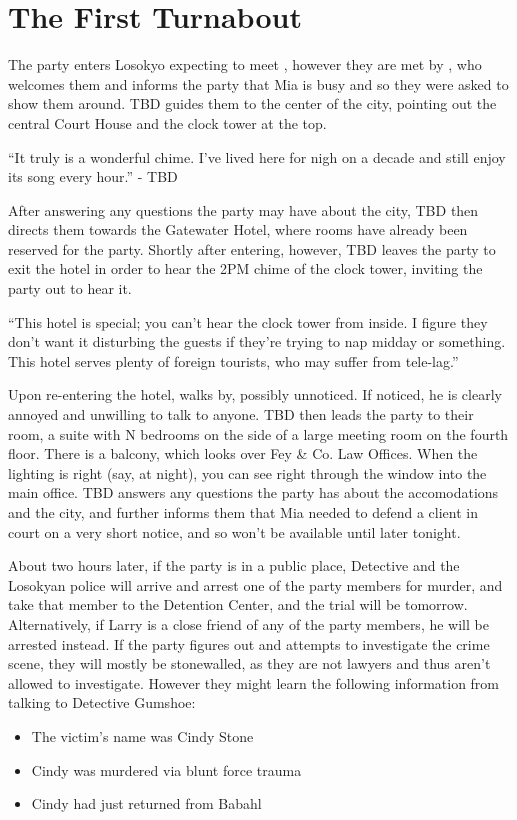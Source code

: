 \section{The First Turnabout}
The party enters Losokyo expecting to meet , however they are met by , who welcomes them and informs the party that Mia is busy and so they were asked to show them around. TBD guides them to the center of the city, pointing out the central Court House and the clock tower at the top. 
\begin{center}
``It truly is a wonderful chime. I've lived here for nigh on a decade and still enjoy its song every hour.''
- TBD \end{center}

After answering any questions the party may have about the city, TBD then directs them towards the Gatewater Hotel, where rooms have already been reserved for the party. Shortly after entering, however, TBD leaves the party to exit the hotel in order to hear the 2PM chime of the clock tower, inviting the party out to hear it.

\begin{center}
``This hotel is special; you can't hear the clock tower from inside. I figure they don't want it disturbing the guests if they're trying to nap midday or something. This hotel serves plenty of foreign tourists, who may suffer from tele-lag.''
\end{center}

Upon re-entering the hotel,  walks by, possibly unnoticed. If noticed, he is clearly annoyed and unwilling to talk to anyone. TBD then leads the party to their room, a suite with N bedrooms on the side of a large meeting room on the fourth floor. There is a balcony, which looks over Fey \& Co. Law Offices. When the lighting is right (say, at night), you can see right through the window into the main office. TBD answers any questions the party has about the accomodations and the city, and further informs them that Mia needed to defend a client in court on a very short notice, and so won't be available until later tonight.

About two hours later, if the party is in a public place, Detective  and the Losokyan police will arrive and arrest one of the party members for murder, and take that member to the Detention Center, and the trial will be tomorrow. Alternatively, if Larry is a close friend of any of the party members, he will be arrested instead. If the party figures out and attempts to investigate the crime scene, they will mostly be stonewalled, as they are not lawyers and thus aren't allowed to investigate. However they might learn the following information from talking to Detective Gumshoe:
\begin{itemize}
\item The victim's name was Cindy Stone
\item Cindy was murdered via blunt force trauma
\item Cindy had just returned from Babahl
\end{itemize}

